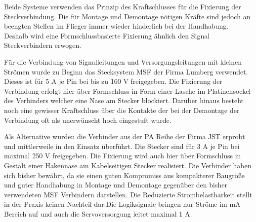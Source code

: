 Beide Systeme verwenden das Prinzip des Kraftschlusses für die Fixierung der Steckverbindung. Die für Montage und Demontage nötigen Kräfte sind jedoch an beengten Stellen im Flieger immer wieder hinderlich bei der Handhabung. Deshalb wird eine Formschlussbasierte Fixierung ähnlich den Signal Steckverbindern erwogen.


Für die Verbindung von Signalleitungen  und Versorgungsleitungen mit kleinen Strömen wurde zu Beginn das Stecksystem MSF der Firma Lumberg verwendet.
Dieses ist für 5 A je Pin bei bis zu 160 V freigegeben. Die Fixierung der Verbindung erfolgt hier über Formschluss in Form einer Lasche im Platinensockel des Verbinders welcher eine Nase am Stecker blockiert. Darüber hinaus besteht noch eine gewisser Kraftschluss über die Kontakte der bei der Demontage der Verbindung oft als unerwünscht hoch eingestuft wurde.


Als Alternative wurden die Verbinder aus der PA Reihe der Firma JST erprobt und mittlerweile in den Einsatz überführt.
Die Stecker sind für 3 A je Pin bei maximal 250 V freigegeben.
Die Fixierung wird auch hier über Formschluss in Gestalt einer Hakennase am Kabelseitigen Stecker realisiert.
Die Verbinder haben sich bisher bewährt, da sie einen guten Kompromiss aus kompakterer Baugröße und guter Handhabung in Montage und Demontage gegenüber den bisher verwendeten MSF Verbindern darstellen.
Die Reduzierte Strombelastbarkeit stellt in der Praxis keinen Nachteil dar.Die Logiksignale bringen nur Ströme im mA Bereich auf und auch die Servoversorgung leitet maximal 1 A.

